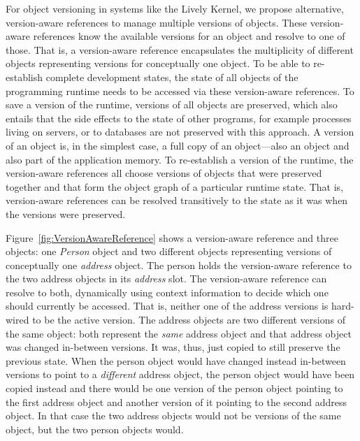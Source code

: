 

For object versioning in systems like the Lively Kernel, we propose alternative, version-aware references to manage multiple versions of objects.
These version-aware references know the available versions for an object and resolve to one of those.
That is, a version-aware reference encapsulates the multiplicity of different objects representing versions for conceptually one object.
To be able to re-establish complete development states, the state of all objects of the programming runtime needs to be accessed via these version-aware references.
To save a version of the runtime, versions of all objects are preserved, which also entails that the side effects to the state of other programs, for example processes living on servers, or to databases are not preserved with this approach.
A version of an object is, in the simplest case, a full copy of an object---also an object and also part of the application memory.
To re-establish a version of the runtime, the version-aware references all choose versions of objects that were preserved together and that form the object graph of a particular runtime state.
That is, version-aware references can be resolved transitively to the state as it was when the versions were preserved.


Figure~\ref{fig:VersionAwareReference} shows a version-aware reference and three objects:
one \emph{Person} object and two different objects representing versions of conceptually one \emph{address} object.
The person holds the version-aware reference to the two address objects in its \emph{address} slot.
The version-aware reference can resolve to both, dynamically using context information to decide which one should currently be accessed.
That is, neither one of the address versions is hard-wired to be the active version.
The address objects are two different versions of the same object: both represent the \emph{same} address object and that address object was changed in-between versions.
It was, thus, just copied to still preserve the previous state.
When the person object would have changed instead in-between versions to point to a \emph{different} address object, the person object would have been copied instead and there would be one version of the person object pointing to the first address object and another version of it pointing to the second address object.
In that case the two address objects would not be versions of the same object, but the two person objects would.

